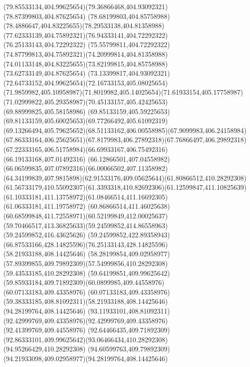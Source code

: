 {{\curveto(79.85533134,404.99625654)(79.36866468,404.93092321)(78.87399803,404.87625654)
\curveto(78.68199803,404.85758988)(78.4886647,404.83225655)(78.29533138,404.81358988)
\curveto(77.62333139,404.75892321)(76.94333141,404.72292322)(76.25133143,404.72292322)
\curveto(75.55799811,404.72292322)(74.87799813,404.75892321)(74.20999814,404.81358988)
\curveto(74.01133148,404.83225655)(73.82199815,404.85758988)(73.62733149,404.87625654)
\curveto(73.13399817,404.93092321)(72.64733152,404.99625654)(72.16733153,405.08025654)
\curveto(71.9859982,405.10958987)(71.8019982,405.14025654)(71.61933154,405.17758987)
\curveto(71.02999822,405.29358987)(70.45133157,405.42425653)(69.88999825,405.58158986)
\curveto(69.85133159,405.59225653)(69.81133159,405.60025653)(69.77266492,405.61092319)
\curveto(69.13266494,405.79625652)(68.51133162,406.00558985)(67.9099983,406.24158984)
\curveto(67.86333164,406.25625651)(67.8179983,406.27892318)(67.76866497,406.29892318)
\curveto(67.22333165,406.51758984)(66.69933167,406.75492316)(66.19133168,407.01492316)
\curveto(66.12866501,407.04558982)(66.06599835,407.07892316)(66.00066502,407.11358982)
\curveto(64.34199839,407.9815898)(62.91533176,409.05625644)(61.80866512,410.28292308)
\curveto(61.56733179,410.55092307)(61.3393318,410.82692306)(61.12599847,411.10825639)
\curveto(61.10333181,411.13758972)(61.08466514,411.16692305)(61.06333181,411.19758972)
\curveto(60.86866514,411.46025638)(60.68599848,411.72558971)(60.52199849,412.00025637)
\curveto(59.70466517,413.36825633)(59.24599852,414.86558963)(59.24599852,416.43625626)
\curveto(59.24599852,422.89358943)(66.87533166,428.14825596)(76.25133143,428.14825596)
\moveto(58.21933188,408.14425646)
\curveto(58.28199854,409.02958977)(57.89399855,409.79892309)(57.54999856,410.28292308)
\lineto(59.43533185,410.28292308)
\curveto(59.64199851,409.99625642)(59.85933184,409.71892309)(60.0899985,409.44558976)
\lineto(60.07133183,409.43358976)
\curveto(60.07133183,409.43358976)(59.38333185,408.81092311)(58.21933188,408.14425646)
\moveto(94.28199764,408.14425646)
\curveto(93.11933101,408.81092311)(92.42999769,409.43358976)(92.42999769,409.43358976)
\lineto(92.41399769,409.44558976)
\curveto(92.64466435,409.71892309)(92.86333101,409.99625642)(93.06466434,410.28292308)
\lineto(94.95266429,410.28292308)
\curveto(94.60599763,409.79892309)(94.21933098,409.02958977)(94.28199764,408.14425646)
}
}

